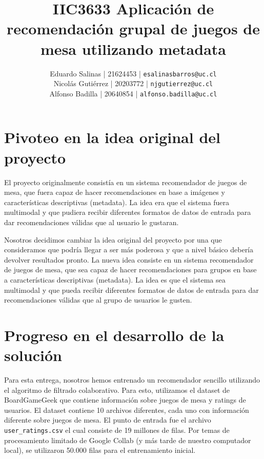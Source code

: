 \documentclass[11pt]{article}
\title{IIC3633 Aplicación de recomendación grupal de juegos de mesa utilizando metadata}
\author{\normalfont 
Eduardo Salinas | 21624453 | \texttt{esalinasbarros@uc.cl} \\
Nicolás Gutiérrez | 20203772 | \texttt{njgutierrez@uc.cl} \\
Alfonso Badilla | 20640854 | \texttt{alfonso.badilla@uc.cl} \\
}
\begin{document}
\maketitle
\newpage

\section{Pivoteo en la idea original del proyecto}

El proyecto originalmente consistía en un sistema recomendador de juegos de mesa, que fuera capaz de hacer recomendaciones en base a imágenes y características descriptivas (metadata). La idea era que el sistema fuera multimodal y que pudiera recibir diferentes formatos de datos de entrada para dar recomendaciones válidas que al usuario le gustaran. 

Nosotros decidimos cambiar la idea original del proyecto por una que consideramos que podría llegar a ser más poderosa y que a nivel básico debería devolver resultados pronto. La nueva idea consiste en un sistema recomendador de juegos de mesa, que sea capaz de hacer recomendaciones para grupos en base a características descriptivas (metadata). La idea es que el sistema sea multimodal y que pueda recibir diferentes formatos de datos de entrada para dar recomendaciones válidas que al grupo de usuarios le gusten.


\section{Progreso en el desarrollo de la solución}

Para esta entrega, nosotros hemos entrenado un recomendador sencillo utilizando el algoritmo de filtrado colaborativo. Para esto, utilizamos el dataset de BoardGameGeek que contiene información sobre juegos de mesa y ratings de usuarios. El dataset contiene 10 archivos diferentes, cada uno con información diferente sobre juegos de mesa. El punto de entrada fue el archivo \texttt{user\_ratings.csv} el cual consiste de 19 millones de filas. Por temas de procesamiento limitado de Google Collab (y más tarde de nuestro computador local), se utilizaron 50.000 filas para el entrenamiento inicial.

\end{document}

